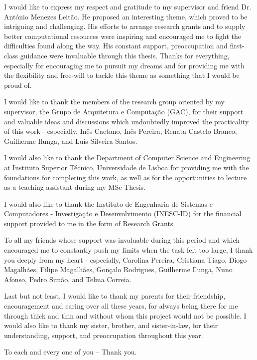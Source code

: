 
I would like to express my respect and gratitude to my supervisor and friend Dr. António Menezes Leitão. He proposed an interesting theme, which proved to be intriguing and challenging. His efforts to arrange research grants and to supply better computational resources were inspiring and encouraged me to fight the difficulties found along the way. His constant support, preoccupation and first-class guidance were invaluable through this thesis. Thanks for everything, especially for encouraging me to pursuit my dreams and for providing me with the flexibility and free-will to tackle this theme as something that I would be proud of.  

I would like to thank the members of the research group oriented by my supervisor, the Grupo de Arquitetura e Computação (GAC), for their support and valuable ideas and discussions which undoubtedly improved the practicality of this work - especially, Inês Caetano, Inês Pereira, Renata Castelo Branco, Guilherme Ilunga, and Luís Silveira Santos. 

I would also like to thank the Department of Computer Science and Engineering at Instituto Superior Técnico, Universidade de Lisboa for providing me with the foundations for completing this work, as well as for the opportunities to lecture as a teaching assistant during my MSc Thesis. 

I would also like to thank the Instituto de Engenharia de Sistemas e Computadores - Investigação e Desenvolvimento (INESC-ID) for the financial support provided to me in the form of Research Grants.


To all my friends whose support was invaluable during this period and which encouraged me to constantly push my limits when the task felt too large, I thank you deeply from my heart - especially, Carolina Pereira, Cristiana Tiago, Diogo Magalhães, Filipe Magalhães, Gonçalo Rodrigues, Guilherme Ilunga, Nuno Afonso, Pedro Simão, and Telma Correia.

Last but not least, I would like to thank my parents for their friendship, encouragement and caring over all these years, for always being there for me through thick and thin and without whom this project would not be possible. I would also like to thank my sister, brother, and sister-in-law, for their understanding, support, and preoccupation throughout this year.

To each and every one of you -- Thank you.